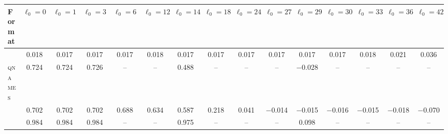 \begin{tabular}{@{}lcccccccccccccc@{}}
\toprule
Format & $\ell_0{=}0$ & $\ell_0{=}1$ & $\ell_0{=}3$ & $\ell_0{=}6$ & $\ell_0{=}12$ & $\ell_0{=}14$ & $\ell_0{=}18$ & $\ell_0{=}24$ & $\ell_0{=}27$ & $\ell_0{=}29$ & $\ell_0{=}30$ & $\ell_0{=}33$ & $\ell_0{=}36$ & $\ell_0{=}42$ \\
\midrule
\fmtNone{} & 0.018 & 0.017 & 0.017 & 0.017 & 0.018 & 0.017 & 0.017 & 0.017 & 0.017 & 0.017 & 0.017 & 0.018 & 0.021 & 0.036 \\
\textsc{qnames} & 0.724 & 0.724 & 0.726 & -- & -- & 0.488 & -- & -- & -- & $-$0.028 & -- & -- & -- & -- \\
\fmtOpt{} & 0.702 & 0.702 & 0.702 & 0.688 & 0.634 & 0.587 & 0.218 & 0.041 & $-$0.014 & $-$0.015 & $-$0.016 & $-$0.015 & $-$0.018 & $-$0.070 \\
\fmtLetter{} & 0.984 & 0.984 & 0.984 & -- & -- & 0.975 & -- & -- & -- & 0.098 & -- & -- & -- & -- \\
\bottomrule
\end{tabular}

